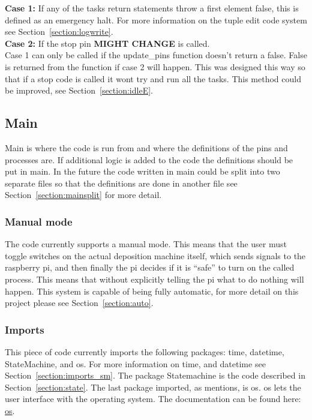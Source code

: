 \documentclass{article}
\begin{document}
\textbf{Case 1:} If any of the tasks return statements throw a first element false, this is defined as an emergency halt. For more information on the tuple edit code system see Section~\ref{section:logwrite}. \\

\textbf{Case 2:} If the stop pin \textbf{MIGHT CHANGE} is called. \\

Case 1 can only be called if the update\_pins function doesn't return a false. False is returned from the function if case 2 will happen. This was designed this way so that if a stop code is called it wont try and run all the tasks. This method could be improved, see Section~\ref{section:idleE}.

\subsection{Main}
\label{section:main}
Main is where the code is run from and where the definitions of the pins and processes are. If additional logic is added to the code the definitions should be put in main. In the future the code written in main could be split into two separate files so that the definitions are done in another file see Section~\ref{section:mainsplit} for more detail.

\subsubsection{Manual mode}
The code currently supports a manual mode. This means that the user must toggle switches on the actual deposition machine itself, which sends signals to the raspberry pi, and then finally the pi decides if it is ``safe'' to turn on the called process. This means that without explicitly telling the pi what to do nothing will happen. This system is capable of being fully automatic, for more detail on this project please see Section~\ref{section:auto}.

\subsubsection{Imports}
This piece of code currently imports the following packages: time, datetime, StateMachine, and os. For more information on time, and datetime see Section~\ref{section:imports_sm}. The package Statemachine is the code described in Section~\ref{section:state}. The last package imported, as mentions, is os. os lets the user interface with the operating system. The documentation can be found here: \href{https://docs.python.org/3/library/os.html}{os}.
\end{document}
